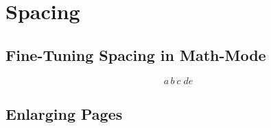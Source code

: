 \documentclass{article}
\begin{document}
\section{Spacing}
\subsection{Fine-Tuning Spacing in Math-Mode}
$$
a \, b \: c \; d \! e
$$

\subsection{Enlarging Pages}
\newpage
\enlargethispage{2cm}
\end{document}
